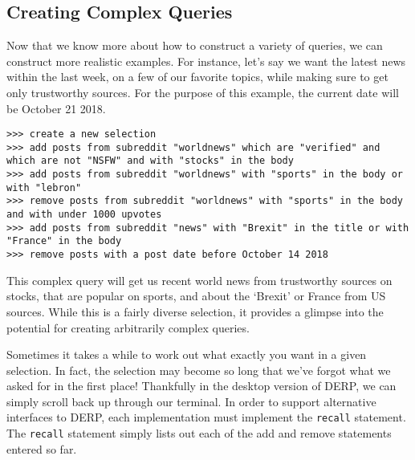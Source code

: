 \subsection{Creating Complex Queries}

Now that we know more about how to construct a variety of queries, we can construct more realistic examples. For instance, let’s say we want the latest news within the last week, on a few of our favorite topics, while making sure to get only trustworthy sources. For the purpose of this example, the current date will be October 21 2018.
\newline\begin{minipage}{\linewidth}\begin{lstlisting}
>>> create a new selection
>>> add posts from subreddit "worldnews" which are "verified" and which are not "NSFW" and with "stocks" in the body
>>> add posts from subreddit "worldnews" with "sports" in the body or with "lebron"
>>> remove posts from subreddit "worldnews" with "sports" in the body and with under 1000 upvotes
>>> add posts from subreddit "news" with "Brexit" in the title or with "France" in the body
>>> remove posts with a post date before October 14 2018
\end{lstlisting}\end{minipage}
This complex query will get us recent world news from trustworthy sources on stocks, that are popular on sports, and about the ‘Brexit’ or France from US sources. While this is a fairly diverse selection, it provides a glimpse into the potential for creating arbitrarily complex queries.

Sometimes it takes a while to work out what exactly you want in a given selection. In fact, the selection may become so long that we’ve forgot what we asked for in the first place! Thankfully in the desktop version of DERP, we can simply scroll back up through our terminal. In order to support alternative interfaces to DERP, each implementation must implement the \texttt{recall} statement. The \texttt{recall} statement simply lists out each of the add and remove statements entered so far.

